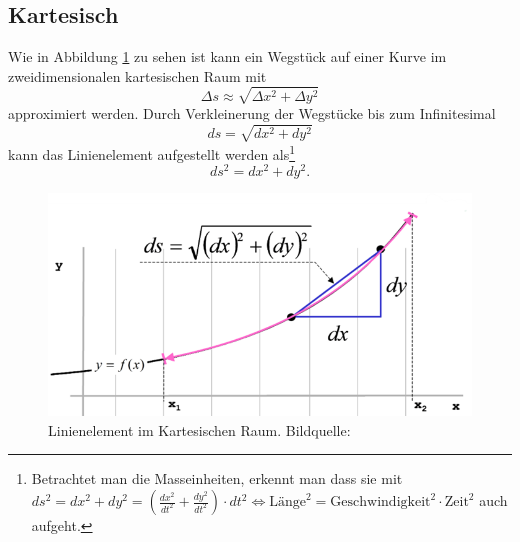 %
%
%
%
\subsection{Kartesisch\label{geodaeten:section:Linienelemente:Kartesisch}}
Wie in Abbildung \ref{geodaeten:figure:Linienelemente:Kartesisch:figure1} zu sehen ist kann ein Wegstück auf einer Kurve im zweidimensionalen kartesischen Raum mit
\begin{equation}
	\Delta s \approx \sqrt{\Delta x^2 + \Delta y^2}
\end{equation}
approximiert werden.
Durch Verkleinerung der Wegstücke bis zum Infinitesimal 
\begin{equation}
	d s = \sqrt{d x^2 + d y^2}
\end{equation}
kann das Linienelement aufgestellt werden als\footnote{
Betrachtet man die Masseinheiten, erkennt man dass sie mit $ds^2 = dx^2 + dy^2 = \left( \frac{dx^2}{dt^2}+\frac{dy^2}{dt^2} \right) \cdot dt^2 \Leftrightarrow \text{Länge}^2 = \text{Geschwindigkeit}^2 \cdot \text{Zeit}^2$ auch aufgeht.
}
%
\begin{equation}
 	ds^2 = d x^2 + d y^2.
 	\label{geodaeten:equation:Linienelemente:Kartesisch:equation1}
\end{equation}

\begin{figure}
	\centering
	
	\includegraphics[width=0.7\linewidth]{papers/geodaeten/Abbildungen/Linienelemente/LinKartes1}
	\caption{Linienelement im Kartesischen Raum. Bildquelle: \cite{geodaeten:kartesisch}} 
	\label{geodaeten:figure:Linienelemente:Kartesisch:figure1}	
\end{figure}
